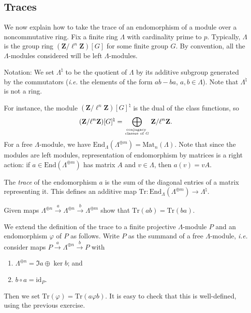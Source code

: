 \subsection{Traces}

We now explain how to take the trace of an endomorphism of a module over a noncommutative ring. Fix a finite ring $\Lambda$ with cardinality prime to $p$. Typically, $\Lambda$ is the group ring $(\mathbf{Z}/\ell^n\mathbf{Z})[G]$ for some finite group $G$. By convention, all the $\Lambda$-modules considered will be left $\Lambda$-modules.

Notation:
We set $\Lambda^\natural$ to be the quotient of $\Lambda$ by its additive subgroup generated by the commutators ({\it i.e.} the elements of the form $ab-ba$, $a, b \in \Lambda$). Note that $\Lambda^\natural$ is not a ring. 


For instance, the module $(\mathbf{Z}/\ell^n\mathbf{Z})[G]^\natural$ is the dual of the class functions, so 
$$
(\mathbf{Z}/\ell^n\mathbf{Z})[G]^\natural = \bigoplus_{\text{conjugacy } \atop \text{classes of $G$}} \mathbf{Z}/\ell^n\mathbf{Z}.
$$ 
For a free $\Lambda$-module, we have $\text{End}_\Lambda(\Lambda^{\oplus m}) = \text{Mat}_n(\Lambda)$. Note that since the modules are left modules, representation of endomorphism by matrices is a right action: if $a \in \text{End}(\Lambda^{\oplus m})$ has matrix $A$ and $v \in \Lambda$, then $a(v) = v A$.

\begin{definition}
The \emph{trace} of the endomorphism $a$ is the sum of the diagonal entries of a matrix representing it. This defines an additive map $\text{Tr} : \text{End}_\Lambda(\Lambda^{\oplus m}) \to \Lambda^\natural$.
\end{definition}

\begin{exercise} 
Given maps $\Lambda^{\oplus n} \xrightarrow{a} \Lambda^{\oplus n} \xrightarrow{b} \Lambda^{\oplus m}$ show that $\text{Tr}(ab) = \text{Tr}(ba)$. 
\end{exercise}

We extend the definition of the trace to a finite projective $\Lambda$-module $P$ and an endomorphism $\varphi$ of $P$ as follows. Write $P$ as the summand of a free $\Lambda$-module, {\it i.e.} consider maps $P \xrightarrow{a} \Lambda^{\oplus n} \xrightarrow{b} P$ with 
\begin{enumerate}
\item
$\Lambda^{\oplus n} = \Im a \oplus \ker b$; and
\item
$b\circ a = \text{id}_P$.
\end{enumerate}
Then we set $\text{Tr}(\varphi) = \text{Tr}(a\varphi b)$. It is easy to check that this is well-defined, using the previous exercise.

